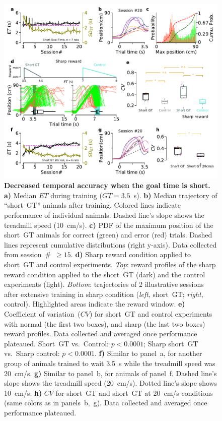 \begin{figure}[!bt]
  \begin{center}
    \includegraphics[width=\textwidth]{ch-time/figures/ShortGT-SharpTrd.pdf}
    \caption[Short~GT \& Sharp Conditions]
    {\textbf{Decreased temporal accuracy when the goal time is short.}
    \textbf{a)}
    Median $ET$ during training ($GT=3.5$~s).
    \textbf{b)}
    Median trajectory of ``short~GT'' animals after training.
    Colored lines indicate performance of individual animals.
    Dashed line's slope shows the treadmill speed (10~cm/s).
    \textbf{c)}
    PDF of the maximum position of the short~GT animals for correct (green) and error (red) trials.
    Dashed lines represent cumulative distributions (right y-axis).
    Data collected from session~\#~$\geq15$.
    \textbf{d)} 
    Sharp reward condition applied to short~GT and control experiments.
    \textit{Top}: reward profiles of the sharp reward condition applied to the short~GT (dark) and the control experiments (light).
    \textit{Bottom}: trajectories of 2 illustrative sessions after extensive training in sharp condition (\textit{left}, short~GT; \textit{right}, control).
    Highlighted areas indicate the reward window.
    \textbf{e)}
    Coefficient of variation~($CV$) for short~GT and control experiments with normal (the first two boxes), and sharp (the last two boxes) reward profiles.
    Data collected and averaged once performance plateaued.
    Short~GT vs.\ Control: $p<0.0001$;
    Sharp short~GT vs.\ Sharp control: $p<0.0001$.
    \textbf{f)}
    Similar to panel~a, for another group of animals trained to wait 3.5~s while the treadmill speed was 20~cm/s.
    \textbf{g)}
    Similar to panel~b, for animals of panel~f.
    Dashed line's slope shows the treadmill speed (20~cm/s).
    Dotted line's slope shows 10~cm/s.
    \textbf{h)}
    $CV$ for short~GT and short~GT at 20~cm/s conditions (same colors as in panels~b,~g).
    Data collected and averaged once performance plateaued.
    }
    \label{fig:time:shortSharp}
  \end{center}
\end{figure}